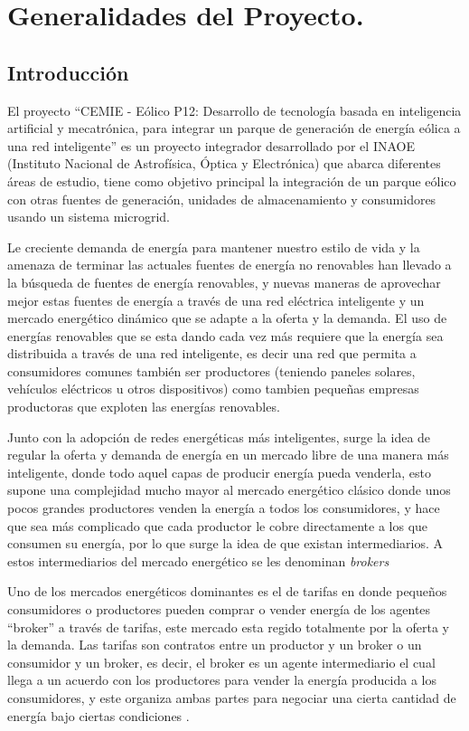 \chapter{Generalidades del Proyecto.}
\newpage
\section*{Introducción}
El proyecto ``CEMIE - Eólico P12: Desarrollo de tecnología basada en inteligencia artificial y mecatrónica, para integrar un parque de generación de energía eólica a una red inteligente'' es un proyecto integrador desarrollado por el INAOE (Instituto Nacional de Astrofísica, Óptica y Electrónica) que abarca diferentes áreas de estudio, tiene como objetivo principal la integración de un parque eólico con otras fuentes de generación, unidades de almacenamiento y consumidores usando un
sistema microgrid.

Le creciente demanda de energía para mantener nuestro estilo de vida y la amenaza de terminar las actuales fuentes de energía no renovables han llevado a la búsqueda de fuentes de energía renovables, y nuevas maneras de aprovechar mejor estas fuentes de energía a través de una red eléctrica inteligente y un mercado energético dinámico que se adapte a la oferta y la demanda.
El uso de energías renovables que se esta dando cada vez más requiere que la energía sea distribuida a través de una red inteligente, es decir una red que permita a consumidores comunes también ser productores (teniendo paneles solares, vehículos eléctricos u otros dispositivos) como tambien pequeñas empresas productoras que exploten las energías renovables.

Junto con la adopción de redes energéticas más inteligentes, surge la idea de regular la oferta y demanda de energía en un mercado libre de una manera más inteligente, donde todo aquel capas de producir energía pueda venderla, esto supone una complejidad mucho mayor al mercado energético clásico donde unos pocos grandes productores venden la energía a todos los consumidores, y hace que sea más complicado que cada productor le cobre directamente a los que consumen su energía, por lo que surge la idea de que existan intermediarios. A estos intermediarios del mercado energético se les denominan \textit{brokers}

Uno de los mercados energéticos dominantes es el de tarifas en donde pequeños consumidores o productores pueden comprar o vender energía de los agentes ``broker'' a través de tarifas, este mercado esta regido totalmente por la oferta y la demanda.
Las tarifas son contratos entre un productor y un broker o un consumidor y un broker, es decir, el broker es un agente intermediario el cual llega a un acuerdo con los productores para vender la energía producida a los consumidores, y este organiza ambas partes para negociar una cierta cantidad de energía bajo ciertas condiciones \cite{MPAlonsoAYRGonzalezDesarrolloDeTec}.

